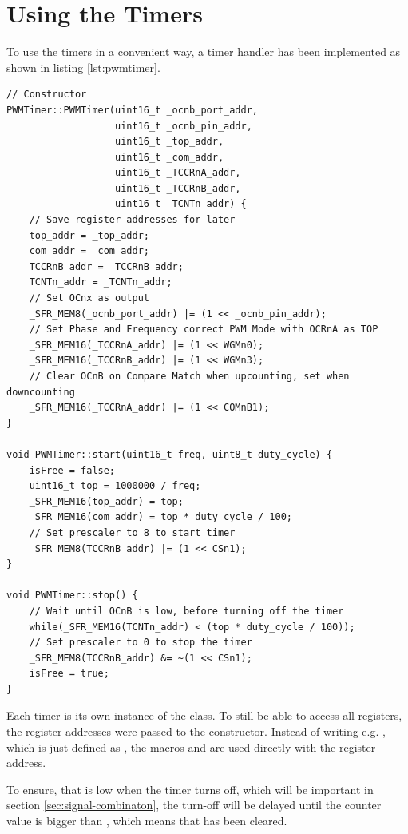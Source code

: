 \section{Using the Timers}

To use the timers in a convenient way, a timer handler has been implemented as shown in listing \ref{lst:pwmtimer}.

\begin{lstlisting}[caption=PWMTimer class, label=lst:pwmtimer]
// Constructor
PWMTimer::PWMTimer(uint16_t _ocnb_port_addr,
				   uint16_t _ocnb_pin_addr,
				   uint16_t _top_addr,
				   uint16_t _com_addr,
				   uint16_t _TCCRnA_addr,
				   uint16_t _TCCRnB_addr, 
				   uint16_t _TCNTn_addr) {
    // Save register addresses for later
    top_addr = _top_addr;
    com_addr = _com_addr;
    TCCRnB_addr = _TCCRnB_addr;
    TCNTn_addr = _TCNTn_addr;
    // Set OCnx as output
    _SFR_MEM8(_ocnb_port_addr) |= (1 << _ocnb_pin_addr);
    // Set Phase and Frequency correct PWM Mode with OCRnA as TOP
    _SFR_MEM16(_TCCRnA_addr) |= (1 << WGMn0);
    _SFR_MEM16(_TCCRnB_addr) |= (1 << WGMn3);
    // Clear OCnB on Compare Match when upcounting, set when downcounting
    _SFR_MEM16(_TCCRnA_addr) |= (1 << COMnB1);
}

void PWMTimer::start(uint16_t freq, uint8_t duty_cycle) {
    isFree = false;
    uint16_t top = 1000000 / freq;
    _SFR_MEM16(top_addr) = top;
    _SFR_MEM16(com_addr) = top * duty_cycle / 100;
    // Set prescaler to 8 to start timer
    _SFR_MEM8(TCCRnB_addr) |= (1 << CSn1);
}

void PWMTimer::stop() {
    // Wait until OCnB is low, before turning off the timer
    while(_SFR_MEM16(TCNTn_addr) < (top * duty_cycle / 100));
    // Set prescaler to 0 to stop the timer
    _SFR_MEM8(TCCRnB_addr) &= ~(1 << CSn1);
    isFree = true;
}
\end{lstlisting}

Each timer is its own instance of the  class. To still be able to access all registers, the register addresses were passed to the constructor. Instead of writing e.g. , which is just defined as , the macros  and  are used directly with the register address.

To ensure, that  is low when the timer turns off, which will be important in section \ref{sec:signal-combinaton}, the turn-off will be delayed until the counter value is bigger than , which means that  has been cleared.

